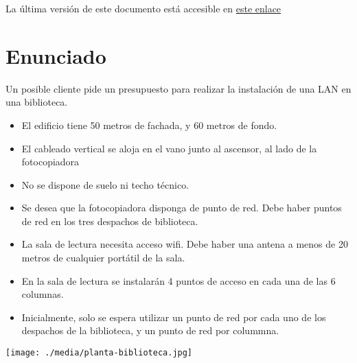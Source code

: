 \documentclass[a4paper]{article}
\renewcommand{\includegraphics}[2][]{\IfFileExists{#2.pdf}{\originalincludegraphics[#1]{#2.pdf}}{\originalincludegraphics[#1]{#2}}}
\begin{document}
La última versión de este documento está accesible en \href{https://alvarogonzalezsotillo.github.io/apuntes-clase/planificacion-administracion-redes-asir1/apuntes/2/par-2-practica-cableado-oficina-guiada.pdf}{este enlace}



\section{Enunciado}
\label{sec:org0000003}
Un posible cliente pide un presupuesto para realizar la instalación de una LAN en una biblioteca.

\begin{itemize}
\item El edificio tiene 50 metros de fachada, y 60 metros de fondo.
\item El cableado vertical se aloja en el vano junto al ascensor, al lado de la fotocopiadora
\item No se dispone de suelo ni techo técnico.
\item Se desea que la fotocopiadora disponga de punto de red. Debe haber puntos de red en los tres despachos de biblioteca.
\item La sala de lectura necesita acceso wifi. Debe haber una antena a menos de 20 metros de cualquier portátil de la sala.
\item En la sala de lectura se instalarán 4 puntos de acceso en cada una de las 6 columnas.
\item Inicialmente, solo se espera utilizar un punto de red por cada uno de los despachos de la biblioteca, y un punto de red por colummna.
\end{itemize}


\begin{center}
\texttt{[image: ./media/planta-biblioteca.jpg]}
\end{center}
\end{document}
